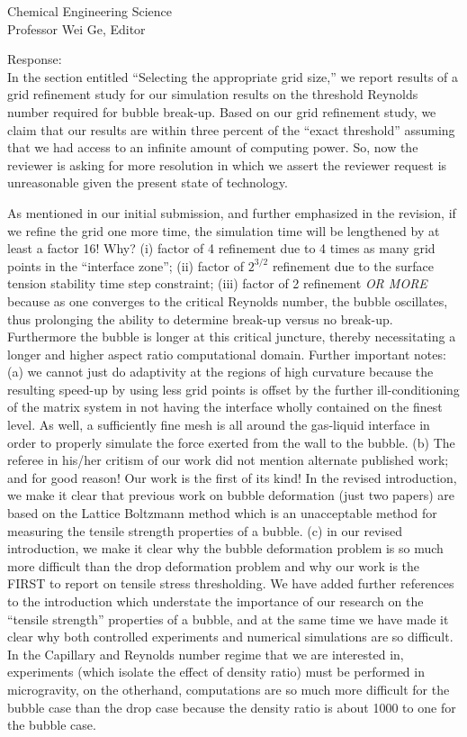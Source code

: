 \documentclass{letter}
\begin{document}
\begin{letter}{
Chemical Engineering Science\\
Professor Wei Ge, Editor\\}
\begin{enumerate}
Response: \\
In the section entitled ``Selecting the appropriate grid size,'' we 
report results of a grid refinement study for our simulation results on
the threshold Reynolds number required for bubble break-up.  Based on
our grid refinement study, we claim that our results are within three
percent of the ``exact threshold'' assuming that we had access to an
infinite amount of computing power.  So, now the reviewer is asking for
more resolution in which we assert the reviewer request is 
unreasonable given the present state of technology.

As mentioned in our initial submission, and further emphasized in the revision,
if we refine the grid one more time, the simulation time will be 
lengthened by at least a factor 16! Why? (i) factor of 4 refinement 
due to 4 times as many grid points in the ``interface zone''; (ii) factor of $2^{3/2}$
refinement due to the surface tension stability time step constraint; (iii) factor of 2 refinement {\em OR MORE} because as one converges to the critical Reynolds number, the bubble oscillates, thus prolonging the ability to determine break-up versus no break-up.  Furthermore the bubble is longer at this critical juncture, thereby necessitating a longer and higher aspect ratio computational domain.  Further important notes: (a) we cannot just do adaptivity at the regions of high curvature because the resulting speed-up by using less grid points is offset by the further ill-conditioning of the matrix system in not having the interface wholly contained on the finest level.  As well, a sufficiently fine mesh is all around the gas-liquid interface in order to properly simulate the force exerted from the wall to the bubble. (b) The referee in his/her critism of our work did not mention alternate published work; and for good reason! Our work is the first of its kind! In the revised introduction, we make it clear that previous work on bubble deformation (just two papers) are based on the Lattice Boltzmann method which is an unacceptable method for measuring the tensile strength properties of a bubble.   (c) in our revised introduction, we make it clear why the bubble deformation problem is so much more difficult than the drop deformation problem and why our work is the FIRST to report on
tensile stress thresholding.  We have added further references to the introduction which understate the importance of our research on the ``tensile strength'' properties of a bubble, and at the same time we have made it clear why both controlled experiments and numerical simulations are so difficult.  In the Capillary and Reynolds number regime that we are interested in, experiments (which isolate the effect of density ratio) must be performed in microgravity, on the otherhand, computations are so much more difficult for the bubble case than the drop case because the density ratio is about 
1000 to one for the bubble case.


\end{enumerate}
\end{letter}
\end{document}
